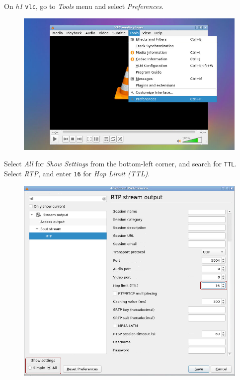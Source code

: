 \documentclass{../UTNetLab}
\begin{document}
    On \textit{h1} \lstinline{vlc}, go to \textit{Tools} menu and select \textit{Preferences}.
    \begin{figure}[H]
        \centering
        \includegraphics[scale=1.6]{img/open-pref}
    \end{figure}
    Select \textit{All} for \textit{Show Settings} from the bottom-left corner,
    and search for \texttt{TTL}.
    Select \textit{RTP},
    and enter \texttt{16} for \textit{Hop Limit (TTL)}.
    \begin{figure}[H]
        \centering
        \includegraphics[scale=2]{img/pref}
    \end{figure}
\end{document}
